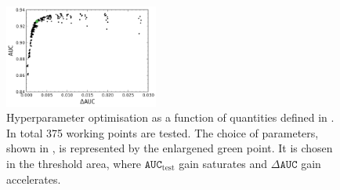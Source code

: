 \begin{figure}[htbp!]
    \centering
    \includegraphics[width=0.45\textwidth]{figures/continuum_suppression/hyperpar_optimisation.png}
    \caption{\label{fig:hyper_param}Hyperparameter optimisation as a function of quantities defined in .
    In total 375 working points are tested.
    The choice of parameters, shown in , is represented by the enlargened green point.
    It is chosen in the threshold area, where $\mathtt{AUC}_{\mathrm{test}}$ gain saturates and $\Delta \mathtt{AUC}$ gain accelerates.
    }
\end{figure}


